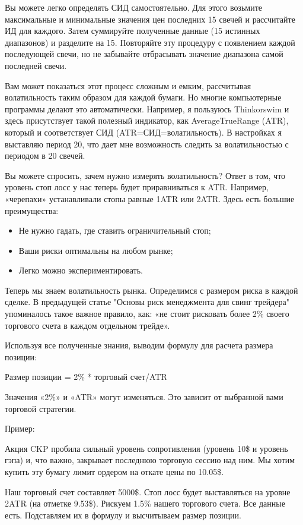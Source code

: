 \documentclass{book}
\begin{document}
Вы можете легко определять СИД самостоятельно. Для этого возьмите максимальные и минимальные значения цен последних 15 свечей и рассчитайте ИД для каждого. Затем суммируйте полученные данные (15 истинных диапазонов) и разделите на 15. Повторяйте эту процедуру с появлением каждой последующей свечи, но не забывайте отбрасывать значение диапазона самой последней свечи.

Вам может показаться этот процесс сложным и емким, рассчитывая волатильность таким образом для каждой бумаги. Но многие компьютерные программы делают это автоматически. Например, я пользуюсь Thinkorswim и здесь присутствует такой полезный индикатор, как AverageTrueRange (ATR), который и соответствует СИД (ATR=СИД=волатильность). В настройках я выставляю период 20, что дает мне возможность следить за волатильностью с периодом в 20 свечей.

Вы можете спросить, зачем нужно измерять волатильность? Ответ в том, что уровень стоп лосс у нас теперь будет приравниваться к ATR. Например, «черепахи» устанавливали стопы равные 1ATR или 2ATR. Здесь есть большие преимущества:
\begin{itemize}
\item     Не нужно гадать, где ставить ограничительный стоп;
\item     Ваши риски оптимальны на любом рынке;
\item     Легко можно экспериментировать.
\end{itemize}

Теперь мы знаем волатильность рынка. Определимся с размером риска в каждой сделке. В предыдущей статье "Основы риск менеджмента для свинг трейдера" упоминалось такое важное правило, как: «не стоит рисковать более 2\% своего торгового счета в каждом отдельном трейде».

Используя все полученные знания, выводим формулу для расчета размера позиции:

Размер позиции = 2\% * торговый счет/ATR

Значения «2\%» и «ATR» могут изменяться. Это зависит от выбранной вами торговой стратегии.

Пример:

Акция CKP пробила сильный уровень сопротивления (уровень 10\$ и уровень гэпа) и, что важно, закрывает последнюю торговую сессию над ним. Мы хотим купить эту бумагу лимит ордером на откате цены по 10.05\$.

Наш торговый счет составляет 5000\$. Стоп лосс будет выставляться на уровне 2ATR (на отметке 9.53\$). Рискуем 1.5\% нашего торгового счета. Все данные есть. Подставляем их в формулу и высчитываем размер позиции.
\end{document}
